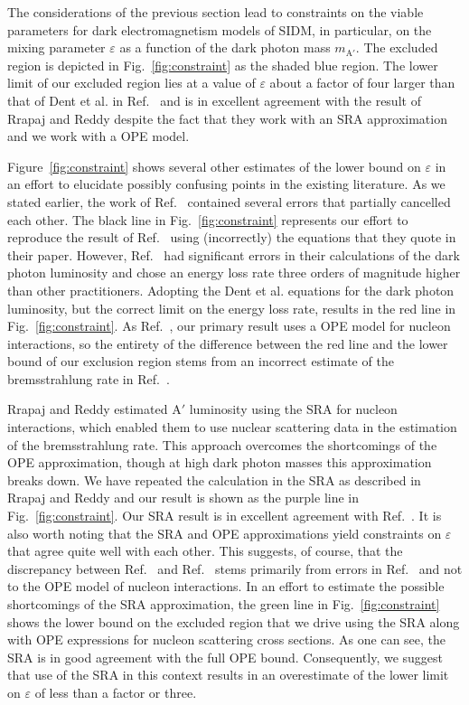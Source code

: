 \documentclass[nofootinbib,prd,superscriptaddress,twocolumn]{revtex4}
\begin{document}
The considerations of the previous section lead to constraints on the 
viable parameters for dark electromagnetism models of SIDM, in particular, 
on the mixing parameter $\varepsilon$ as a function of the dark photon mass $m_{\mathrm{A'}}$. 
The excluded region is depicted in Fig.~\ref{fig:constraint} as the shaded blue region. The 
lower limit of our excluded region lies at a value of $\varepsilon$ about a factor of four 
larger than that of Dent et al. in Ref.~\cite{dent_etal12} and is in excellent agreement 
with the result of Rrapaj and Reddy \cite{rrapaj_reddy16} despite the fact that they work 
with an SRA approximation and we work with a OPE model.

Figure~\ref{fig:constraint} shows several other estimates of the lower bound on 
$\varepsilon$ in an effort to elucidate possibly confusing points in the existing 
literature. As we stated earlier, the work of Ref.~\cite{dent_etal12} contained several 
errors that partially cancelled each other. The black line in Fig.~\ref{fig:constraint} represents 
our effort to reproduce the result of Ref.~\cite{dent_etal12} using (incorrectly) the equations 
that they quote in their paper. However, Ref.~\cite{dent_etal12} had significant errors in 
their calculations of the dark photon luminosity and chose an energy loss rate three orders 
of magnitude higher than other practitioners. Adopting the Dent et al. \cite{dent_etal12} 
equations for the dark photon luminosity, but the correct limit on the energy loss rate, 
results in the red line in Fig.~\ref{fig:constraint}. As Ref.~\cite{dent_etal12}, our primary 
result uses a OPE model for nucleon interactions, so the entirety of the difference between 
the red line and the lower bound of our exclusion region stems from an incorrect estimate 
of the bremsstrahlung rate in Ref.~\cite{dent_etal12}. 


Rrapaj and Reddy \cite{rrapaj_reddy16} estimated $\mathrm{A'}$ luminosity 
using the SRA for nucleon interactions, which enabled them to use 
nuclear scattering data in the estimation of the bremsstrahlung rate. 
This approach overcomes the shortcomings of the OPE approximation, 
though at high dark photon masses this approximation breaks down. 
We have repeated the calculation in the SRA as described in 
Rrapaj and Reddy \cite{rrapaj_reddy16} and our result is 
shown as the purple line in Fig.~\ref{fig:constraint}. 
Our SRA result is in excellent agreement with Ref.~\cite{rrapaj_reddy16}. It is 
also worth noting that the SRA and OPE approximations yield constraints 
on $\varepsilon$ that agree quite well with each other. This suggests, of course, 
that the discrepancy between Ref.~\cite{dent_etal12} and Ref.~\cite{rrapaj_reddy16} 
stems primarily from errors in Ref.~\cite{dent_etal12} and not to the OPE model 
of nucleon interactions. In an effort to estimate 
the possible shortcomings of the SRA approximation, the green line in 
Fig.~\ref{fig:constraint} shows the lower bound on the excluded region that 
we drive using the SRA along with OPE expressions for nucleon scattering 
cross sections. As one can see, the SRA is in good agreement with the full 
OPE bound. Consequently, we suggest that use of the SRA in this context 
results in an overestimate of the lower limit on $\varepsilon$ of less than 
a factor or three. 
\end{document}
